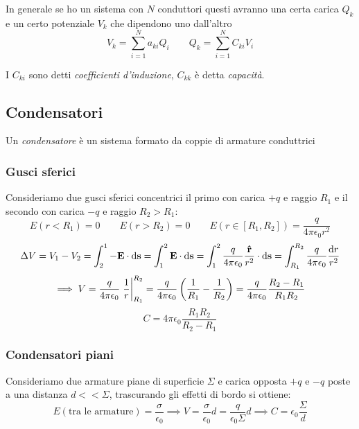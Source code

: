 \documentclass[12pt,a4paper]{article}
\begin{document}
In generale se ho un sistema con $N$ conduttori questi avranno una certa carica $Q_k$ e un certo potenziale $V_k$ che dipendono uno dall'altro
\begin{equation*}
    V_k = \sum_{i=1}^{N} a_{ki}Q_i \quad \quad Q_k = \sum_{i=1}^{N} C_{ki}V_i
\end{equation*}

I $C_{ki}$ sono detti \textit{coefficienti d'induzione}, $C_{kk}$ è detta \textit{capacità}.

\subsection{Condensatori}
\begin{definition}
    Un \textit{condensatore} è un sistema formato da coppie di armature conduttrici
\end{definition}

\subsubsection{Gusci sferici}
Consideriamo due gusci sferici concentrici il primo con carica $+q$ e raggio $R_1$ e il secondo con carica $-q$ e raggio $R_2 > R_1$:
\begin{equation*}
    E(r<R_1)=0\qquad E(r>R_2)=0\qquad E(r \in [R_1,R_2])= \frac{q}{4\pi\epsilon_0r^2}
\end{equation*}
\begin{equation*}
    \Delta V = V_1-V_2= \int_{2}^{1}-\vb{E}\cdot\dd{\vb{s}}= \int_{1}^{2}\vb{E}\cdot\dd{\vb{s}}= 
    \int_{1}^{2}\frac{q}{4\pi\epsilon_0}\frac{\vu{r}}{r^2}\cdot\dd{\vb{s}} = \int_{R_1}^{R_2}\frac{q}{4\pi\epsilon_0}\frac{\dd{r}}{r^2}
\end{equation*}
\begin{equation*}
    \implies V = \frac{q}{4\pi\epsilon_0}\eval{\frac{1}{r}}_{R_1}^{R_2}= \frac{q}{4\pi\epsilon_0}\left( \frac{1}{R_1}-\frac{1}{R_2} \right)
    = \frac{q}{4\pi\epsilon_0}\frac{R_2-R_1}{R_1R_2}
\end{equation*}
\begin{equation*}
    C = 4\pi\epsilon_0\frac{R_1R_2}{R_2-R_1}
\end{equation*}

\subsubsection{Condensatori piani}
Consideriamo due armature piane di superficie $\Sigma$ e carica opposta $+q$ e $-q$ poste a una distanza $d<<\Sigma$, trascurando gli effetti di bordo si ottiene:
\begin{equation*}
    E(\text{tra le armature})= \frac{\sigma}{\epsilon_0}\implies V = \frac{\sigma}{\epsilon_0}d = \frac{q}{\epsilon_0\Sigma}d 
    \implies C = \epsilon_0\frac{\Sigma}{d}
\end{equation*}
\end{document}
